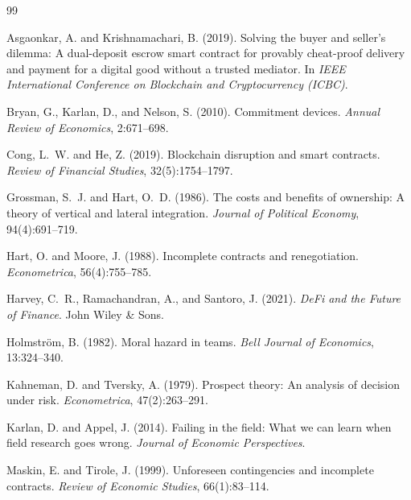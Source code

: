 \documentclass[12pt,a4paper]{article}
\begin{document}
\begin{thebibliography}{99}

Asgaonkar, A. and Krishnamachari, B. (2019).
\newblock Solving the buyer and seller's dilemma: A dual-deposit escrow smart contract for provably cheat-proof delivery and payment for a digital good without a trusted mediator.
\newblock In \textit{IEEE International Conference on Blockchain and Cryptocurrency (ICBC)}.

Bryan, G., Karlan, D., and Nelson, S. (2010).
\newblock Commitment devices.
\newblock \textit{Annual Review of Economics}, 2:671--698.

Cong, L.~W. and He, Z. (2019).
\newblock Blockchain disruption and smart contracts.
\newblock \textit{Review of Financial Studies}, 32(5):1754--1797.

Grossman, S.~J. and Hart, O.~D. (1986).
\newblock The costs and benefits of ownership: A theory of vertical and lateral integration.
\newblock \textit{Journal of Political Economy}, 94(4):691--719.

Hart, O. and Moore, J. (1988).
\newblock Incomplete contracts and renegotiation.
\newblock \textit{Econometrica}, 56(4):755--785.

Harvey, C.~R., Ramachandran, A., and Santoro, J. (2021).
\newblock \textit{DeFi and the Future of Finance}.
\newblock John Wiley \& Sons.

Holmstr{\"o}m, B. (1982).
\newblock Moral hazard in teams.
\newblock \textit{Bell Journal of Economics}, 13:324--340.

Kahneman, D. and Tversky, A. (1979).
\newblock Prospect theory: An analysis of decision under risk.
\newblock \textit{Econometrica}, 47(2):263--291.

Karlan, D. and Appel, J. (2014).
\newblock Failing in the field: What we can learn when field research goes wrong.
\newblock \textit{Journal of Economic Perspectives}.

Maskin, E. and Tirole, J. (1999).
\newblock Unforeseen contingencies and incomplete contracts.
\newblock \textit{Review of Economic Studies}, 66(1):83--114.


\end{thebibliography}
\end{document}
